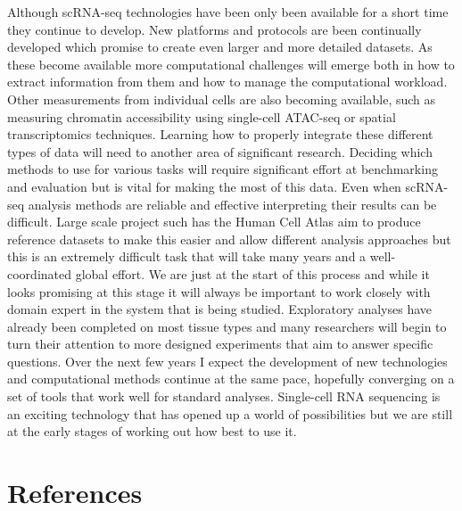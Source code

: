 \documentclass[11pt,a4paper,titlepage,twoside,openright]{style/unimelbthesis}
\theoremstyle{definition}
\theoremstyle{definition}
\theoremstyle{definition}
\theoremstyle{remark}
\begin{document}
\begin{mainmatter}
Although scRNA-seq technologies have been only been available for a short time they continue to develop. New platforms and protocols are been continually developed which promise to create even larger and more detailed datasets. As these become available more computational challenges will emerge both in how to extract information from them and how to manage the computational workload. Other measurements from individual cells are also becoming available, such as measuring chromatin accessibility using single-cell ATAC-seq or spatial transcriptomics techniques. Learning how to properly integrate these different types of data will need to another area of significant research. Deciding which methods to use for various tasks will require significant effort at benchmarking and evaluation but is vital for making the most of this data. Even when scRNA-seq analysis methods are reliable and effective interpreting their results can be difficult. Large scale project such has the Human Cell Atlas aim to produce reference datasets to make this easier and allow different analysis approaches but this is an extremely difficult task that will take many years and a well-coordinated global effort. We are just at the start of this process and while it looks promising at this stage it will always be important to work closely with domain expert in the system that is being studied. Exploratory analyses have already been completed on most tissue types and many researchers will begin to turn their attention to more designed experiments that aim to answer specific questions. Over the next few years I expect the development of new technologies and computational methods continue at the same pace, hopefully converging on a set of tools that work well for standard analyses. Single-cell RNA sequencing is an exciting technology that has opened up a world of possibilities but we are still at the early stages of working out how best to use it.

\hypertarget{references}{%
\chapter*{References}\label{references}}

\hypertarget{refs}{}

\end{mainmatter}
\end{document}
